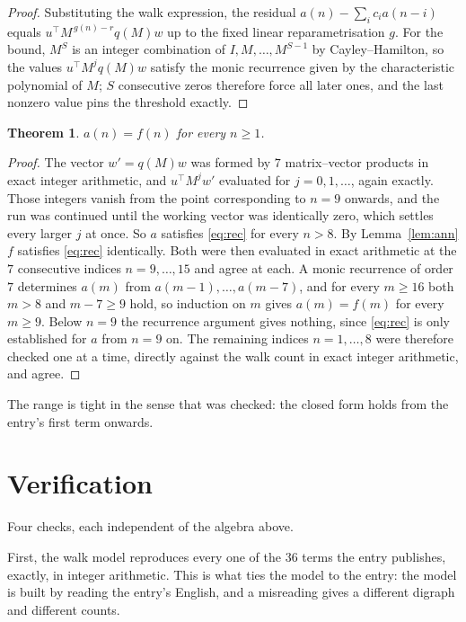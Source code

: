 \documentclass[11pt,a4paper]{article}
\theoremstyle{plain}
\newtheorem{theorem}{Theorem}
\theoremstyle{definition}
\begin{document}
\begin{proof}
Substituting the walk expression, the residual $a(n)-\sum_ic_ia(n-i)$ equals
$u^{\!\top}M^{\,g(n)-r}q(M)w$ up to the fixed linear reparametrisation $g$. For the bound,
$M^{S}$ is an integer combination of $I,M,\dots,M^{S-1}$ by Cayley--Hamilton, so the values
$u^{\!\top}M^{j}q(M)w$ satisfy the monic recurrence given by the characteristic polynomial of
$M$; $S$ consecutive zeros therefore force all later ones, and the last nonzero value pins the
threshold exactly.
\end{proof}

\begin{theorem}
$a(n)=f(n)$ for every $n\ge1$.
\end{theorem}

\begin{proof}
The vector $w'=q(M)w$ was formed by $7$ matrix--vector products in exact integer
arithmetic, and $u^{\!\top}M^{j}w'$ evaluated for $j=0,1,\dots$, again exactly. Those integers
vanish from the point corresponding to $n=9$ onwards, and the run was continued until the
working vector was identically zero, which settles every larger $j$ at once. So $a$ satisfies
\eqref{eq:rec} for every $n>8$. By Lemma~\ref{lem:ann} $f$ satisfies \eqref{eq:rec}
identically. Both were then evaluated in exact arithmetic at the $7$ consecutive indices
$n=9,\dots,15$ and agree at each. A monic recurrence of order $7$
determines $a(m)$ from $a(m-1),\dots,a(m-7)$, and for every $m\ge16$ both
$m>8$ and $m-7\ge9$ hold, so induction on $m$ gives $a(m)=f(m)$ for every
$m\ge9$.
Below $n=9$ the recurrence argument gives nothing, since \eqref{eq:rec} is only
established for $a$ from $n=9$ on. The remaining indices $n=1,\dots,8$ were
therefore checked one at a time, directly against the walk count in exact integer arithmetic,
and agree.
\end{proof}

The range is tight in the sense that was checked: the closed form holds from the entry's first term onwards.

\section{Verification}

Four checks, each independent of the algebra above.

First, the walk model reproduces every one of the $36$ terms the entry publishes,
exactly, in integer arithmetic. This is what ties the model to the entry: the model is built
by reading the entry's English, and a misreading gives a different digraph and different
counts.
\end{document}

